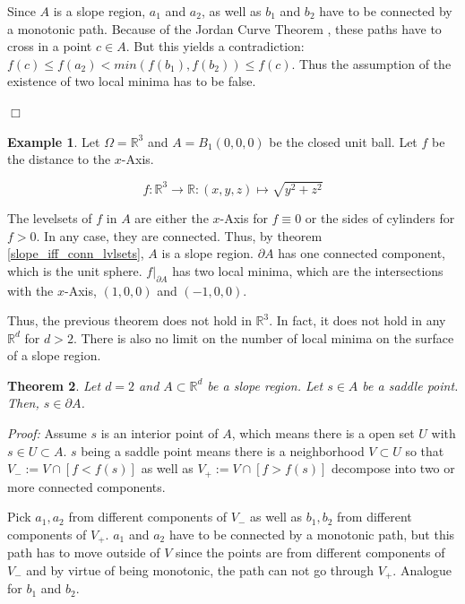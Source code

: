 \documentclass[11pt,twoside,twocolumn,a4paper]{article}
\theoremstyle{plain}
\newtheorem{thm}{Theorem}[section] %
\theoremstyle{definition}
\newtheorem{exmp}[thm]{Example} %
\begin{document}
Since $A$ is a slope region, $a_1$ and $a_2$, as well as $b_1$ and $b_2$ have to be connected by a monotonic path.
Because of the Jordan Curve Theorem \cite{jordan1887cours}, these paths have to cross in a point $c \in A$.
But this yields a contradiction: $f(c) \leq f(a_2) < min(f(b_1), f(b_2)) \leq f(c)$.
Thus the assumption of the existence of two local minima has to be false.

\hfill $\Box$

\begin{exmp}
Let $\Omega = \mathbb R^3$ and $A = B_1(0,0,0)$ be the closed unit ball.
Let $f$ be the distance to the $x$-Axis. 

\begin{equation*}
f: \mathbb R^3 \to \mathbb R: (x,y,z) \mapsto \sqrt{y^2 + z^2}
\end{equation*}

The levelsets of $f$ in $A$ are either the $x$-Axis for $f \equiv 0$ or the sides of cylinders for $f > 0$.
In any case, they are connected.
Thus, by theorem \ref{slope_iff_conn_lvlsets}, $A$ is a slope region.
$\partial A$ has one connected component, which is the unit sphere.
$f|_{\partial A}$ has two local minima, which are the intersections with the $x$-Axis, $(1,0,0)$ and $(-1,0,0)$.
\end{exmp}

Thus, the previous theorem does not hold in $\mathbb R^3$.
In fact, it does not hold in any $\mathbb R^d$ for $d > 2$.
There is also no limit on the number of local minima on the surface of a slope region.

\begin{thm}
\label{thm:saddle_on_border}
Let $d = 2$ and $A \subset \mathbb R^d$ be a slope region.
Let $s \in A$ be a saddle point.
Then, $s \in \partial A$.
\end{thm}

\emph{Proof:} Assume $s$ is an interior point of $A$, which means there is a open set $U$ with $s \in U \subset A$.
$s$ being a saddle point means there is a neighborhood $V \subset U$ so that $V_- := V \cap [f < f(s)]$ as well as $V_+ := V \cap [f > f(s)]$ decompose into two or more connected components.

Pick $a_1, a_2$ from different components of $V_-$ as well as $b_1, b_2$ from different components of $V_+$.
$a_1$ and $a_2$ have to be connected by a monotonic path, but this path has to move outside of $V$ since the points are from different components of $V_-$ and by virtue of being monotonic, the path can not go through $V_+$.
Analogue for $b_1$ and $b_2$.
\end{document}
